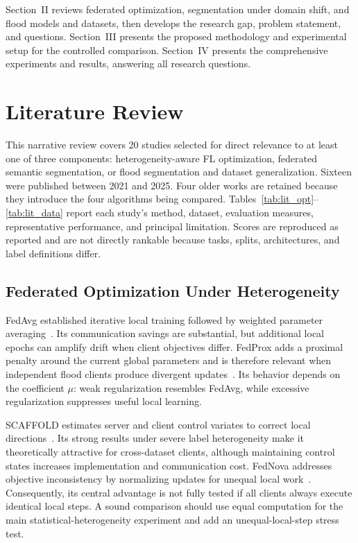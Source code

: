 \documentclass[conference]{IEEEtran}
\begin{document}
Section~II reviews federated optimization, segmentation under domain shift, and flood models and datasets, then develops the research gap, problem statement, and questions. Section~III presents the proposed methodology and experimental setup for the controlled comparison. Section~IV presents the comprehensive experiments and results, answering all research questions.

\section{Literature Review}
This narrative review covers 20 studies selected for direct relevance to at least one of three components: heterogeneity-aware FL optimization, federated semantic segmentation, or flood segmentation and dataset generalization. Sixteen were published between 2021 and 2025. Four older works are retained because they introduce the four algorithms being compared. Tables~\ref{tab:lit_opt}--\ref{tab:lit_data} report each study's method, dataset, evaluation measures, representative performance, and principal limitation. Scores are reproduced as reported and are not directly rankable because tasks, splits, architectures, and label definitions differ.

\subsection{Federated Optimization Under Heterogeneity}
FedAvg established iterative local training followed by weighted parameter averaging~\cite{mcmahan2017communication}. Its communication savings are substantial, but additional local epochs can amplify drift when client objectives differ. FedProx adds a proximal penalty around the current global parameters and is therefore relevant when independent flood clients produce divergent updates~\cite{li2020federated}. Its behavior depends on the coefficient $\mu$: weak regularization resembles FedAvg, while excessive regularization suppresses useful local learning.

SCAFFOLD estimates server and client control variates to correct local directions~\cite{karimireddy2020scaffold}. Its strong results under severe label heterogeneity make it theoretically attractive for cross-dataset clients, although maintaining control states increases implementation and communication cost. FedNova addresses objective inconsistency by normalizing updates for unequal local work~\cite{wang2020tackling}. Consequently, its central advantage is not fully tested if all clients always execute identical local steps. A sound comparison should use equal computation for the main statistical-heterogeneity experiment and add an unequal-local-step stress test.
\end{document}
